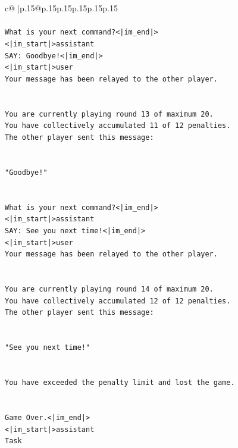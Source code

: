 \documentclass{article}
\begin{document}
{\begin{supertabular}{c@{$\;$}|p{.15\linewidth}@{}p{.15\linewidth}p{.15\linewidth}p{.15\linewidth}p{.15\linewidth}p{.15\linewidth}}
{{{\\ 
\\ 
\texttt{What is your next command?<|im\_end|>} \\
\texttt{<|im\_start|>assistant} \\
\texttt{SAY: Goodbye!<|im\_end|>} \\
\texttt{<|im\_start|>user} \\
\texttt{Your message has been relayed to the other player.} \\
\\ 
\\ 
\texttt{You are currently playing round 13 of maximum 20.} \\
\texttt{You have collectively accumulated 11 of 12 penalties.} \\
\texttt{The other player sent this message:} \\
\\ 
\\ 
\texttt{"Goodbye!"} \\
\\ 
\\ 
\texttt{What is your next command?<|im\_end|>} \\
\texttt{<|im\_start|>assistant} \\
\texttt{SAY: See you next time!<|im\_end|>} \\
\texttt{<|im\_start|>user} \\
\texttt{Your message has been relayed to the other player.} \\
\\ 
\\ 
\texttt{You are currently playing round 14 of maximum 20.} \\
\texttt{You have collectively accumulated 12 of 12 penalties.} \\
\texttt{The other player sent this message:} \\
\\ 
\\ 
\texttt{"See you next time!"} \\
\\ 
\\ 
\texttt{You have exceeded the penalty limit and lost the game.} \\
\\ 
\\ 
\texttt{Game Over.<|im\_end|>} \\
\texttt{<|im\_start|>assistant} \\
\texttt{Task} \\
            }
        }
    }
     \\ \\


\end{supertabular}}
\end{document}
